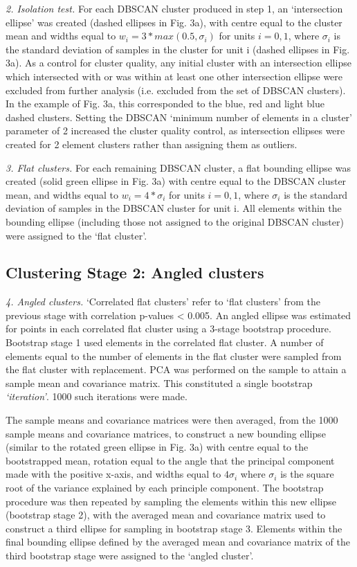 \documentclass{article}
\begin{document}
\textit{2. Isolation test.} For each DBSCAN cluster produced in step 1, an `intersection ellipse' was created (dashed ellipses in Fig. 3a), with centre equal to the cluster mean and widths equal to $w_i = 3*max(0.5, \sigma_i)$ for units $i=0,1$, where $\sigma_i$ is the standard deviation of samples in the cluster for unit i (dashed ellipses in Fig. 3a). As a control for cluster quality, any initial cluster with an intersection ellipse which intersected with or was within at least one other intersection ellipse were excluded from further analysis (i.e. excluded from the set of DBSCAN clusters). In the example of Fig. 3a, this corresponded to the blue, red and light blue dashed clusters. Setting the DBSCAN `minimum number of elements in a cluster' parameter of 2 increased the cluster quality control, as intersection ellipses were created for 2 element clusters rather than assigning them as outliers.

\textit{3. Flat clusters.} For each remaining DBSCAN cluster, a flat bounding ellipse was created (solid green ellipse in Fig. 3a) with centre equal to the DBSCAN cluster mean, and widths equal to $w_i = 4*\sigma_i$ for units $i=0,1$, where $\sigma_i$ is the standard deviation of samples in the DBSCAN cluster for unit i. All elements within the bounding ellipse (including those not assigned to the original DBSCAN cluster) were assigned to the `flat cluster'.

\subsection{Clustering Stage 2: Angled clusters}
\label{methods:angled_clusters}

\textit{4. Angled clusters.} `Correlated flat clusters' refer to `flat clusters' from the previous stage with correlation p-values < 0.005. An angled ellipse was estimated for points in each correlated flat cluster using a 3-stage bootstrap procedure. Bootstrap stage 1 used elements in the correlated flat cluster. A number of elements equal to the number of elements in the flat cluster were sampled from the flat cluster with replacement. PCA was performed on the sample to attain a sample mean and covariance matrix. This constituted a single bootstrap \textit{`iteration'}. 1000 such iterations were made. 

The sample means and covariance matrices were then averaged, from the 1000 sample means and covariance matrices, to construct a new bounding ellipse (similar to the rotated green ellipse in Fig. 3a) with centre equal to the bootstrapped mean, rotation equal to the angle that the principal component made with the positive x-axis, and widths equal to $4\sigma_i$ where $\sigma_i$ is the square root of the variance explained by each principle component. The bootstrap procedure was then repeated by sampling the elements within this new ellipse (bootstrap stage 2), with the averaged mean and covariance matrix used to construct a third ellipse for sampling in bootstrap stage 3. Elements within the final bounding ellipse defined by the averaged mean and covariance matrix of the third bootstrap stage were assigned to the `angled cluster'.
\end{document}
